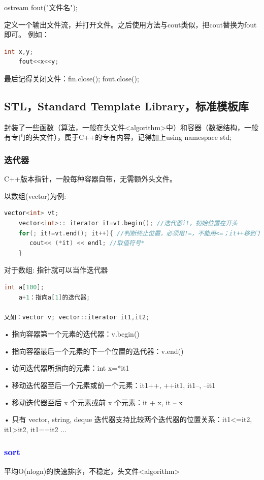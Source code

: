 \documentclass[UTF8]{ctexart}
\begin{document}
ostream fout("文件名");

定义一个输出文件流，并打开文件。之后使用方法与cout类似，把cout替换为fout即可。
例如：
\begin{lstlisting}[language = C,basicstyle=\small\ttfamily]
    int x,y;
    fout<<x<<y;
\end{lstlisting}
最后记得关闭文件：fin.close(); fout.close();
\subsection{STL，Standard Template Library，标准模板库}
封装了一些函数（算法，一般在头文件<algorithm>中）和容器（数据结构，一般有专门的头文件），属于C++的专有内容，记得加上using namespace std;
\subsubsection{迭代器}
C++版本指针，一般每种容器自带，无需额外头文件。

以数组(vector)为例:
\begin{lstlisting}[language = C,basicstyle=\small\ttfamily]
    vector<int> vt;
    vector<int>:: iterator it=vt.begin(); //迭代器it，初始位置在开头
    for(; it!=vt.end(); it++){ //判断终止位置，必须用!=，不能用<=；it++移到下一位置
	   cout<< (*it) << endl; //取值符号*
    }
\end{lstlisting}
对于数组: 指针就可以当作迭代器
\begin{lstlisting}[language = C,basicstyle=\small\ttfamily]
    int a[100];
    a+1：指向a[1]的迭代器;

又如：vector v; vector::iterator it1,it2;
\end{lstlisting}

• 指向容器第一个元素的迭代器：v.begin() 

• 指向容器最后一个元素的下一个位置的迭代器：v.end() 

• 访问迭代器所指向的元素：int x=*it1 

• 移动迭代器至后一个元素或前一个元素：it1++, ++it1, it1--, --it1 

• 移动迭代器至后 x 个元素或前 x 个元素：it + x, it – x 

• 只有 vector, string, deque 迭代器支持比较两个迭代器的位置关系：it1<=it2, it1>it2, it1==it2 ...

\subsubsection{\textcolor{blue}{sort}}
平均O(nlogn)的快速排序，不稳定，头文件<algorithm>
\end{document}

